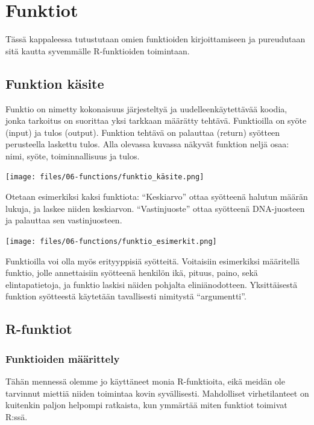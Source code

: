 \documentclass[
]{book}
\begin{document}
\hypertarget{functions}{%
\chapter{Funktiot}\label{functions}}

Tässä kappaleessa tutustutaan omien funktioiden kirjoittamiseen ja pureudutaan sitä kautta syvemmälle R-funktioiden toimintaan.

\hypertarget{funktion-kuxe4site}{%
\section{Funktion käsite}\label{funktion-kuxe4site}}

Funktio on nimetty kokonaisuus järjesteltyä ja uudelleenkäytettävää koodia, jonka tarkoitus on suorittaa yksi tarkkaan määrätty tehtävä. Funktioilla on syöte (input) ja tulos (output). Funktion tehtävä on palauttaa (return) syötteen perusteella laskettu tulos. Alla olevassa kuvassa näkyvät funktion neljä osaa: nimi, syöte, toiminnallisuus ja tulos.

\texttt{[image: files/06-functions/funktio\_käsite.png]}

Otetaan esimerkiksi kaksi funktiota: ``Keskiarvo'' ottaa syötteenä halutun määrän lukuja, ja laskee niiden keskiarvon. ``Vastinjuoste'' ottaa syötteenä DNA-juosteen ja palauttaa sen vastinjuosteen.

\texttt{[image: files/06-functions/funktio\_esimerkit.png]}

Funktioilla voi olla myös erityyppisiä syötteitä. Voitaisiin esimerkiksi määritellä funktio, jolle annettaisiin syötteenä henkilön ikä, pituus, paino, sekä elintapatietoja, ja funktio laskisi näiden pohjalta eliniänodotteen. Yksittäisestä funktion syötteestä käytetään tavallisesti nimitystä ``argumentti''.

\hypertarget{r-funktiot}{%
\section{R-funktiot}\label{r-funktiot}}

\hypertarget{funktioiden-muxe4uxe4rittely}{%
\subsection{Funktioiden määrittely}\label{funktioiden-muxe4uxe4rittely}}

Tähän mennessä olemme jo käyttäneet monia R-funktioita, eikä meidän ole tarvinnut miettiä niiden toimintaa kovin syvällisesti. Mahdolliset virhetilanteet on kuitenkin paljon helpompi ratkaista, kun ymmärtää miten funktiot toimivat R:ssä.
\end{document}
